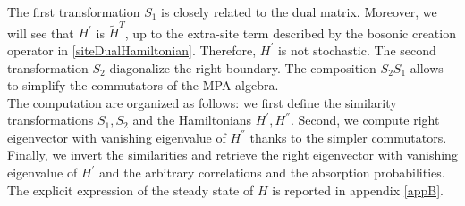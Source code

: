 \documentclass[10pt]{article}
\numberwithin{equation}{section}
\numberwithin{equation}{subsection}
\newcommand{\com}[1]{{ (* {\color{red}\small #1}*)}}
\begin{document}
The first transformation $S_{1}$ is closely related to the dual matrix. Moreover, we will see that $H^{'}$ is $\widetilde{H}^{T}$, up to the extra-site term described by the bosonic creation operator in \eqref{siteDualHamiltonian}. Therefore, $H^{'}$ is not stochastic. The second transformation $S_{2}$ diagonalize the right boundary. The composition  $S_{2} S_{1}$ allows to simplify the commutators of the MPA algebra. \\

The computation are organized as follows: we first define the similarity transformations $S_{1},S_{2}$ and the Hamiltonians $H^{'},H^{''}$. Second, we compute right eigenvector with vanishing eigenvalue of $H^{''}$ thanks to the simpler commutators. Finally, we invert the similarities and retrieve the right eigenvector with vanishing eigenvalue of $H^{'}$ and  the arbitrary correlations and the absorption probabilities. The explicit expression of the steady state of $H$ is reported in appendix \ref{appB}. 

\end{document}
